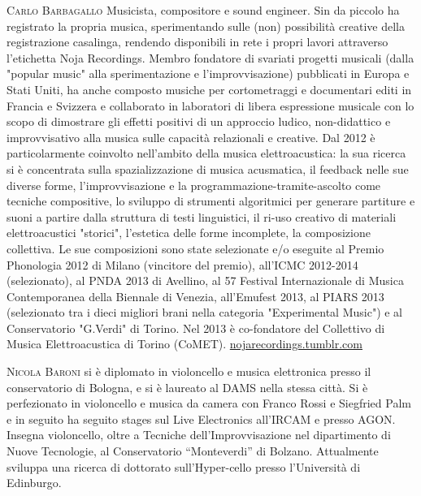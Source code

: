 \documentclass[9pt, twoside, a5paper]{extreport}
\newcommand{\biografia}[2]{%
\noindent \textsc{#1} %
#2 %
\medskip
}%
\begin{document}
\begin{multicols}{2}

\biografia{Carlo Barbagallo}{Musicista, compositore e sound engineer. Sin da piccolo ha registrato la propria musica, sperimentando sulle (non) possibilità creative della registrazione casalinga, rendendo disponibili in rete i propri lavori attraverso l'etichetta Noja Recordings. Membro fondatore di svariati progetti musicali (dalla "popular music" alla sperimentazione e l'improvvisazione) pubblicati in Europa e Stati Uniti, ha anche composto musiche per cortometraggi e documentari editi in Francia e Svizzera e collaborato in laboratori di libera espressione musicale con lo scopo di dimostrare gli effetti positivi di un approccio ludico, non-didattico e improvvisativo alla musica sulle capacità relazionali e creative. Dal 2012 è particolarmente coinvolto nell'ambito della musica elettroacustica: la sua ricerca si è concentrata sulla spazializzazione di musica acusmatica, il feedback nelle sue diverse forme, l'improvvisazione e la programmazione-tramite-ascolto come tecniche compositive, lo sviluppo di strumenti algoritmici per generare partiture e suoni a partire dalla struttura di testi linguistici, il ri-uso creativo di materiali elettroacustici "storici", l'estetica delle forme incomplete, la composizione collettiva. Le sue composizioni sono state selezionate e/o eseguite al Premio Phonologia 2012 di Milano (vincitore del premio), all'ICMC 2012-2014 (selezionato), al PNDA 2013 di Avellino, al 57 Festival Internazionale di Musica Contemporanea della Biennale di Venezia, all'Emufest 2013, al PIARS 2013 (selezionato tra i dieci migliori brani nella categoria "Experimental Music") e al Conservatorio "G.Verdi" di Torino. Nel 2013 è co-fondatore del Collettivo di Musica Elettroacustica di Torino (CoMET).
\href{http://nojarecordings.tumblr.com/about}{nojarecordings.tumblr.com}}

\biografia{Nicola Baroni}{si è diplomato in violoncello e musica elettronica presso il conservatorio di Bologna, e si è laureato al DAMS nella stessa città. Si è perfezionato in violoncello e musica da camera con Franco Rossi e Siegfried Palm e in seguito ha seguito stages sul Live Electronics all'IRCAM e presso AGON. Insegna violoncello, oltre a Tecniche dell'Improvvisazione nel dipartimento di Nuove Tecnologie, al Conservatorio “Monteverdi” di Bolzano. Attualmente sviluppa una ricerca di dottorato sull'Hyper-cello presso l'Università di Edinburgo.}



\end{multicols}
\end{document}

